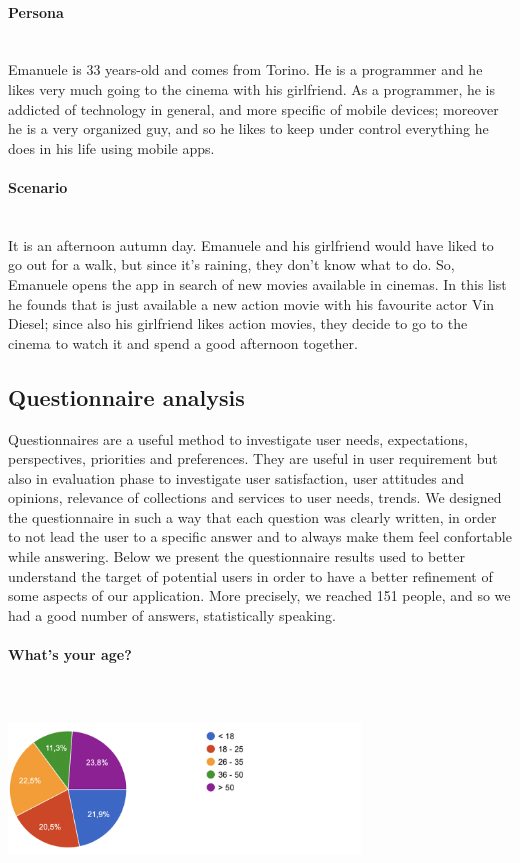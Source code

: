 \documentclass[12pt, a4paper]{article}
\numberwithin{figure}{section}
\begin{document}
\paragraph{Persona}\mbox{}\\
Emanuele is 33 years-old and comes from Torino. He is a programmer and he likes
very much going to the cinema with his girlfriend.
As a programmer, he is addicted of technology in general, and more specific of mobile
devices; moreover he is a very organized guy, and so he likes to keep under control
everything he does in his life using mobile apps.

\paragraph{Scenario}\mbox{}\\
It is an afternoon autumn day. Emanuele and his girlfriend would have liked to go
out for a walk, but since it’s raining, they don’t know what to do. So, Emanuele opens
the app in search of new movies available in cinemas. In this list he founds that is just
available a new action movie with his favourite actor Vin Diesel; since also his
girlfriend likes action movies, they decide to go to the cinema to watch it and spend
a good afternoon together.



\subsection{Questionnaire analysis}

Questionnaires are a useful method to investigate user needs, expectations, perspectives, priorities and preferences.
They are useful in user requirement but also in evaluation phase to investigate user satisfaction, user attitudes and opinions, relevance of collections and services to user needs, trends.
We designed the questionnaire in such a way that each question was clearly written, in order to not lead the user to a specific answer and to
always make them feel confortable while answering.
Below we present the questionnaire results used to better understand the target of potential users in order to have a better refinement of
some aspects of our application.
More precisely, we reached 151 people, and so we had a good number of answers, statistically speaking.\\

\paragraph{What's your age?}\mbox{}\\\\
\includegraphics[width=0.7\textwidth]{Images/age.png}\\
\end{document}
